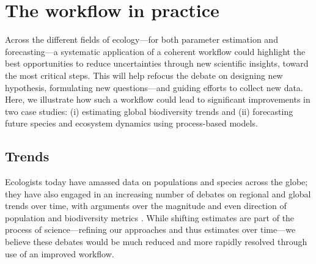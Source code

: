 \documentclass[11pt]{article}
\begin{document}
\section{The workflow in practice}

Across the different fields of ecology---for both parameter estimation and forecasting---a systematic application of a coherent workflow could highlight the best opportunities to reduce uncertainties through new scientific insights, toward the most critical steps. This will help refocus the debate on designing new hypothesis, formulating new questions---and guiding efforts to collect new data. Here, we illustrate how such a workflow could lead to significant improvements in two case studies: (i) estimating global biodiversity trends and (ii) forecasting future species and ecosystem dynamics using process-based models.

\subsection{Trends}


Ecologists today have amassed data on populations and species across the globe; they have also engaged in an increasing number of debates on regional and global trends over time, with arguments over the magnitude and even direction of population and biodiversity metrics \citep{Dornelas2014,Leung2020,terry2022no,muller2024weather}. While shifting estimates are part of the process of science---refining our approaches and thus estimates over time---we believe these debates would be much reduced and more rapidly resolved through use of an improved workflow. %
\end{document}
